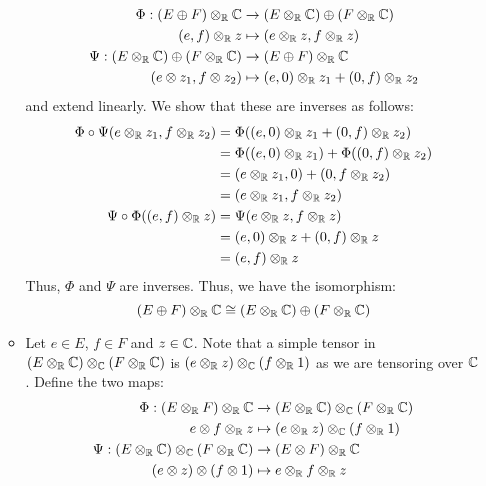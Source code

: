 \documentclass[12pt]{article}
\begin{document}
\begin{solu}
\begin{enumerate}
\begin{itemize}
            \begin{align*}
                \Phi: (E \oplus F) \otimes_\mathbb R \mathbb C &\to (E \otimes_\mathbb R \mathbb C) \oplus (F \otimes_\mathbb R \mathbb C) \\
                (e, f) \otimes_\mathbb R z &\mapsto (e \otimes_\mathbb R z, f \otimes_\mathbb R z) \\
                \Psi: (E \otimes_\mathbb R \mathbb C) \oplus (F \otimes_\mathbb R \mathbb C) &\to (E \oplus F) \otimes_\mathbb R \mathbb C \\
                (e \otimes z_1, f \otimes z_2) &\mapsto (e, 0) \otimes_\mathbb R z_1 + (0, f) \otimes_\mathbb R z_2
            \end{align*} 
            and extend linearly. We show that these are inverses as follows:
            \begin{align*}
                \Phi \circ \Psi(e \otimes_\mathbb R z_1, f \otimes_\mathbb R z_2) &= \Phi((e, 0) \otimes_\mathbb R z_1 + (0, f) \otimes_\mathbb R z_2) \\ 
                &= \Phi((e, 0) \otimes_\mathbb R z_1) + \Phi((0, f) \otimes_\mathbb R z_2) \\
                &= (e \otimes_\mathbb R z_1, 0) + (0, f \otimes_\mathbb R z_2) \\
                &= (e \otimes_\mathbb R z_1, f \otimes_\mathbb R z_2) \\
                \Psi \circ \Phi((e, f) \otimes_\mathbb R z) &= \Psi(e \otimes_\mathbb R z, f \otimes_\mathbb R z) \\
                &= (e, 0) \otimes_\mathbb R z + (0, f) \otimes_\mathbb R z \\
                &= (e, f) \otimes_\mathbb R z
            \end{align*}
            Thus, $\Phi$ and $\Psi$ are inverses. Thus, we have the isomorphism:
            \[(E \oplus F) \otimes_\mathbb R \mathbb C \cong (E \otimes_\mathbb R \mathbb C) \oplus (F \otimes_\mathbb R \mathbb C)\]
            \item Let $e \in E$, $f\in F$ and $z \in \mathbb C$. Note that a simple tensor in $(E \otimes_\mathbb R \mathbb C) \otimes_\mathbb C (F \otimes_\mathbb R \mathbb C)$ is $(e \otimes_\mathbb R z) \otimes_\mathbb C (f \otimes_\mathbb R 1)$ as we are tensoring over $\mathbb C$. Define the two maps: 
            \begin{align*}
                \Phi: (E \otimes_\R F) \otimes_\R \C &\to (E \otimes_\R \C) \otimes_\C (F \otimes_\R \C) \\
                e \otimes f \otimes_\R z &\mapsto (e \otimes_\R z) \otimes_\C (f \otimes_\R 1) \\
                \Psi: (E \otimes_\R \C) \otimes_\C (F \otimes_\R \C) &\to (E \otimes F) \otimes_\R \C \\
                (e \otimes z) \otimes (f \otimes 1) &\mapsto e \otimes_\R f \otimes_\R z

\end{align*}
\end{itemize}
\end{enumerate}
\end{solu}
\end{document}
